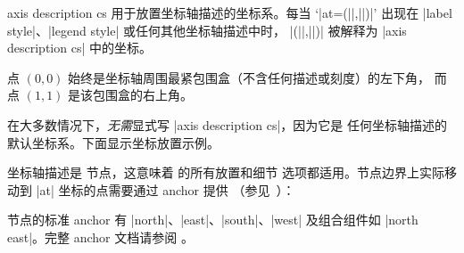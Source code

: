 \begin{coordinatesystem}{axis description cs}
\label{pgfplots:sec:axis:description:cs}
    用于放置坐标轴描述的坐标系。每当 `|at={(||,||)}|'
    出现在 |label style|、|legend style| 或任何其他坐标轴描述中时，
    |(||,||)| 被解释为 |axis description cs| 中的坐标。

    点 $(0,0)$ 始终是坐标轴周围最紧包围盒（不含任何描述或刻度）的左下角，
    而点 $(1,1)$ 是该包围盒的右上角。

    在大多数情况下，\emph{无需}显式写 |axis description cs|，因为它是
    任何坐标轴描述的默认坐标系。下面显示坐标放置示例。
\begin{codeexample}[width=4cm]
\end{codeexample}

    坐标轴描述是 \Tikz{} 节点，这意味着 \cite{tikz} 的所有放置和细节
    选项都适用。节点边界上实际移动到 |at| 坐标的点需要通过 anchor 提供
    （参见~\cite[``Nodes and Edges'']{tikz}）：
\begin{codeexample}[]
\end{codeexample}

    节点的标准 anchor 有 |north|、|east|、|south|、|west| 及组合组件如
    |north east|。完整 anchor 文档请参阅 \cite{tikz}。



\end{coordinatesystem}
